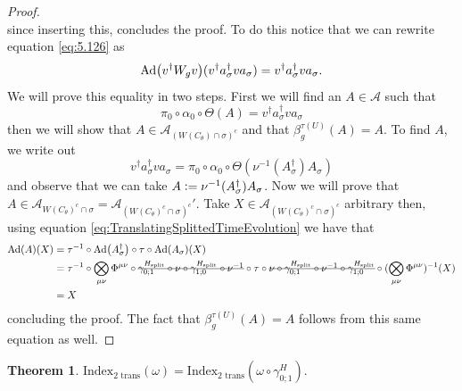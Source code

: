 \documentclass[12pt,a4paper,twoside]{article}
\newcommand{\stkout}[1]{\ifmmode\text{\sout{\ensuremath{#1}}}\else\sout{#1}\fi}
\newcommand{\defeq}{\vcentcolon=}
\let\originalleft\left
\let\originalright\right
\renewcommand{\left}{\mathopen{}\mathclose\bgroup\originalleft}
\renewcommand{\right}{\aftergroup\egroup\originalright}
\renewcommand{\AA}{\mathcal A}
\newcommand{\Ad}[1]{\textrm{Ad}\left(#1\right)}
\theoremstyle{definition}
\newtheorem{theorem}{Theorem}[section]
\numberwithin{equation}{section}
\begin{document}
\begin{proof}
\begin{equation}
	\end{equation}
	since inserting this, concludes the proof. To do this notice that we can rewrite equation \eqref{eq:5.126} as
	\begin{equation}
		\Ad{v^\dagger W_g v}(v^\dagger a_\sigma^\dagger v a_\sigma)=v^\dagger a_\sigma^\dagger v a_\sigma.
	\end{equation}
	We will prove this equality in two steps. First we will find an $A\in\AA$ such that
	\begin{equation}
		\pi_0\circ\alpha_0\circ\Theta(A)=v^\dagger a_\sigma^\dagger v a_\sigma
	\end{equation}
	then we will show that $A\in\AA_{(W(C_\theta)\cap\sigma)^c}$ and that $\beta_g^{\tau(U)}(A)=A$. To find $A$, we write out
	\begin{equation}
		v^\dagger a_\sigma^\dagger v a_\sigma=\pi_0\circ\alpha_0\circ\Theta(\nu^{-1}(A_\sigma^\dagger)A_\sigma)
	\end{equation}
	and observe that we can take $A\defeq \nu^{-1}(A_\sigma^\dagger)A_\sigma$. Now we will prove that $A\in\AA_{W(C_\theta)^c\cap\sigma}=\AA_{(W(C_\theta)^c\cap\sigma)^c}'$. Take $X\in\AA_{(W(C_\theta)^c\cap\sigma)^c}$ arbitrary then, using equation \eqref{eq:TranslatingSplittedTimeEvolution} we have that
	\begin{align}
		\Ad{A}(X)&=\tau^{-1}\circ\Ad{A_\sigma^\dagger}\circ\tau\circ\Ad{A_\sigma}(X)\\
		&=\tau^{-1}\circ\bigotimes_{\mu\nu}\Phi^{\mu\nu}\circ\stkout{\gamma^{H_\text{split}}_{0;1}\circ\nu\circ \gamma^{H_\text{split}}_{1;0}\circ\nu^{-1}}\circ\tau\circ\stkout{\nu\circ\gamma^{H_\text{split}}_{0;1}\circ\nu^{-1}\circ\gamma^{H_\text{split}}_{1;0}}\circ(\bigotimes_{\mu\nu}\Phi^{\mu\nu})^{-1}(X)\\
		&=X
	\end{align}
	concluding the proof. The fact that $\beta_g^{\tau(U)}(A)=A$ follows from this same equation as well.
\end{proof}
\begin{theorem}
	$\textrm{Index}_{\text{2 trans}}(\omega)=\textrm{Index}_{\text{2 trans}}(\omega\circ\gamma^H_{0;1}).$
\end{theorem}
\end{document}
